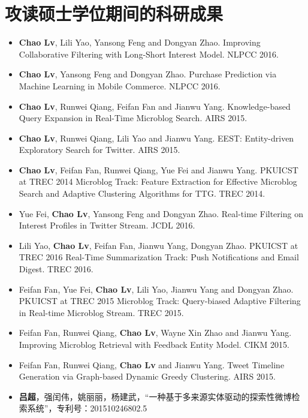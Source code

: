 
\chapter{攻读硕士学位期间的科研成果}
\begin{itemize}
\item \textbf{Chao Lv}, Lili Yao, Yansong Feng and Dongyan Zhao. Improving Collaborative Filtering with Long-Short Interest Model. NLPCC 2016.
\item \textbf{Chao Lv}, Yansong Feng and Dongyan Zhao. Purchase Prediction via Machine Learning in Mobile Commerce. NLPCC 2016.
\item \textbf{Chao Lv}, Runwei Qiang, Feifan Fan and Jianwu Yang. Knowledge-based Query Expansion in Real-Time Microblog Search. AIRS 2015.
\item \textbf{Chao Lv}, Runwei Qiang, Lili Yao and Jianwu Yang. EEST: Entity-driven Exploratory Search for Twitter. AIRS 2015.
\item \textbf{Chao Lv}, Feifan Fan, Runwei Qiang, Yue Fei and Jianwu Yang. PKUICST at TREC 2014 Microblog Track: Feature Extraction for Effective Microblog Search and Adaptive Clustering Algorithms for TTG. TREC 2014.
\item Yue Fei, \textbf{Chao Lv}, Yansong Feng and Dongyan Zhao. Real-time Filtering on Interest Profiles in Twitter Stream. JCDL 2016.
\item Lili Yao, \textbf{Chao Lv}, Feifan Fan, Jianwu Yang, Dongyan Zhao. PKUICST at TREC 2016 Real-Time Summarization Track: Push Notifications and Email Digest. TREC 2016.
\item Feifan Fan, Yue Fei, \textbf{Chao Lv}, Lili Yao, Jianwu Yang and Dongyan Zhao. PKUICST at TREC 2015 Microblog Track: Query-biased Adaptive Filtering in Real-time Microblog Stream. TREC 2015.
\item Feifan Fan, Runwei Qiang, \textbf{Chao Lv}, Wayne Xin Zhao and Jianwu Yang. Improving Microblog Retrieval with Feedback Entity Model. CIKM 2015.
\item Feifan Fan, Runwei Qiang, \textbf{Chao Lv} and Jianwu Yang. Tweet Timeline Generation via Graph-based Dynamic Greedy Clustering. AIRS 2015.
\item \textbf{吕超}，强闰伟，姚丽丽，杨建武，``一种基于多来源实体驱动的探索性微博检索系统''，专利号：201510246802.5
\end{itemize}
